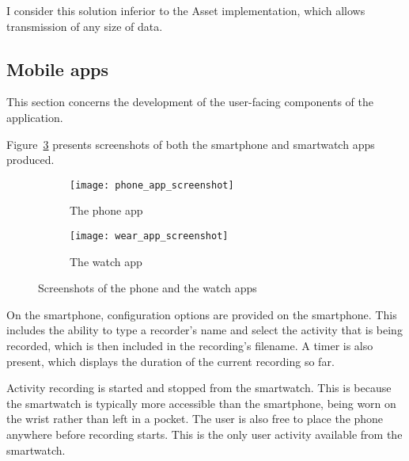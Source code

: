       I consider this solution inferior to the Asset implementation, which allows transmission of any size of data.
    \subsection{Mobile apps}
      This section concerns the development of the user-facing components of the application. 
      
      Figure~\ref{fig:app_screenshots} presents screenshots of both the smartphone and smartwatch apps produced.

      \begin{figure}[!th]
        \centering
        \begin{subfigure}[b]{0.3\textwidth}
                \texttt{[image: phone\_app\_screenshot]}
                \caption{The phone app}
                \label{fig:phone_app_screenshot}
        \end{subfigure}
        \qquad
        \begin{subfigure}[b]{0.3\textwidth}
                \texttt{[image: wear\_app\_screenshot]}
                \caption{The watch app}
                \label{fig:wear_app_screenshot}
        \end{subfigure}
        \caption{Screenshots of the phone and the watch apps}
        \label{fig:app_screenshots}
      \end{figure}
      
      On the smartphone, configuration options are provided on the smartphone. This includes the ability to type a recorder's name and select the activity that is being recorded, which is then included in the recording's filename. A timer is also present, which displays the duration of the current recording so far.
      
      Activity recording is started and stopped from the smartwatch. This is because the smartwatch is typically more accessible than the smartphone, being worn on the wrist rather than left in a pocket. The user is also free to place the phone anywhere before recording starts. This is the only user activity available from the smartwatch.
      
